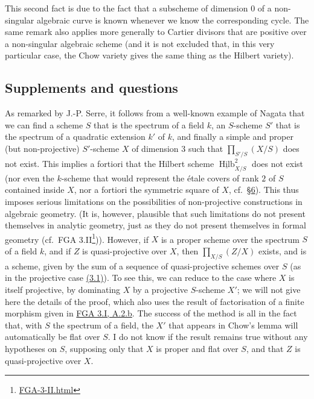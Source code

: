 \documentclass{article}
\renewcommand{\href}[2]{#2\footnote{\url{#1}}}
\newcommand{\oldpage}[1]{\marginpar{\footnotesize$\Big\vert$ \textit{p.~#1}}}
\theoremstyle{definition}
\theoremstyle{definition}
\theoremstyle{definition}
\theoremstyle{definition}
\theoremstyle{remark}
\begin{document}
\oldpage{221-27}This second fact is due to the fact that a subscheme of dimension \(0\) of a non-singular algebraic curve is known whenever we know the corresponding cycle.
The same remark also applies more generally to Cartier divisors that are positive over a non-singular algebraic scheme (and it is not excluded that, in this very particular case, the Chow variety gives the same thing as the Hilbert variety).

\hypertarget{fga-3-iv-section-7}{%
\subsection{Supplements and questions}\label{fga-3-iv-section-7}}

As remarked by J.-P. Serre, it follows from a well-known example of Nagata that we can find a scheme \(S\) that is the spectrum of a field \(k\), an \(S\)-scheme \(S'\) that is the spectrum of a quadratic extension \(k'\) of \(k\), and finally a simple and proper (but non-projective) \(S'\)-scheme \(X\) of dimension \(3\) such that \(\prod_{S'/S}(X/S)\) does not exist.
This implies a fortiori that the Hilbert scheme \(\underline{\operatorname{Hilb}}_{X/S}^2\) does not exist (nor even the \(k\)-scheme that would represent the étale covers of rank \(2\) of \(S\) contained inside \(X\), nor a fortiori the symmetric square of \(X\), cf.~\protect\hyperlink{fga-3-iv-section-6}{§6}).
This thus imposes serious limitations on the possibilities of non-projective constructions in algebraic geometry.
(It is, however, plausible that such limitations do not present themselves in analytic geometry, just as they do not present themselves in formal geometry (cf.~\href{FGA-3-II.html}{FGA 3.II})).
However, if \(X\) is a proper scheme over the spectrum \(S\) of a field \(k\), and if \(Z\) is quasi-projective over \(X\), then \(\prod_{X/S}(Z/X)\) exists, and is a scheme, given by the sum of a sequence of quasi-projective schemes over \(S\) (as in the projective case \protect\hyperlink{fga-3-iv-theorem-3.1}{(3.1)}).
To see this, we can reduce to the case where \(X\) is itself projective, by dominating \(X\) by a projective \(S\)-scheme \(X'\);
we will not give here the details of the proof, which also uses the result of factorisation of a finite morphism given in \protect\hyperlink{fga-3-i-section-A.2.b}{FGA 3.I, A.2.b}.
The success of the method is all in the fact that, with \(S\) the spectrum of a field, the \(X'\) that appears in Chow's lemma will automatically be flat over \(S\).
I do not know if the result remains true without any hypotheses on \(S\), supposing only that \(X\) is proper and flat over \(S\), and that \(Z\) is quasi-projective over \(X\).
\end{document}
